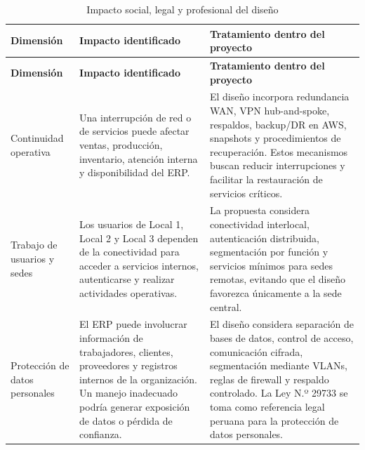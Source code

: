 \documentclass[11pt, a4paper, oneside]{report}
\begin{document}
\begin{xltabular}{\textwidth}{@{}|L{3.2cm}|X|X|@{}}
\caption{Impacto social, legal y profesional del diseño}
\label{tab:impacto_social_legal_profesional} \\

\parbox[c][1.1cm][c]{\linewidth}{\centering\color{white}\bfseries\small Dimensión} &
\parbox[c][1.1cm][c]{\linewidth}{\centering\color{white}\bfseries\small Impacto identificado} &
\parbox[c][1.1cm][c]{\linewidth}{\centering\color{white}\bfseries\small Tratamiento dentro del proyecto} \\ \hline
\endfirsthead

\parbox[c][1.1cm][c]{\linewidth}{\centering\color{white}\bfseries\small Dimensión} &
\parbox[c][1.1cm][c]{\linewidth}{\centering\color{white}\bfseries\small Impacto identificado} &
\parbox[c][1.1cm][c]{\linewidth}{\centering\color{white}\bfseries\small Tratamiento dentro del proyecto} \\ \hline
\endhead

\hline
\endfoot

{\small Continuidad operativa} &
{\small Una interrupción de red o de servicios puede afectar ventas, producción, inventario, atención interna y disponibilidad del ERP.} &
{\small El diseño incorpora redundancia WAN, VPN hub-and-spoke, respaldos, backup/DR en AWS, snapshots y procedimientos de recuperación. Estos mecanismos buscan reducir interrupciones y facilitar la restauración de servicios críticos.} \\ \hline

{\small Trabajo de usuarios y sedes} &
{\small Los usuarios de Local 1, Local 2 y Local 3 dependen de la conectividad para acceder a servicios internos, autenticarse y realizar actividades operativas.} &
{\small La propuesta considera conectividad interlocal, autenticación distribuida, segmentación por función y servicios mínimos para sedes remotas, evitando que el diseño favorezca únicamente a la sede central.} \\ \hline

{\small Protección de datos personales} &
{\small El ERP puede involucrar información de trabajadores, clientes, proveedores y registros internos de la organización. Un manejo inadecuado podría generar exposición de datos o pérdida de confianza.} &
{\small El diseño considera separación de bases de datos, control de acceso, comunicación cifrada, segmentación mediante VLANs, reglas de firewall y respaldo controlado. La Ley N.º 29733 se toma como referencia legal peruana para la protección de datos personales.} \\ \hline


\end{xltabular}
\end{document}
